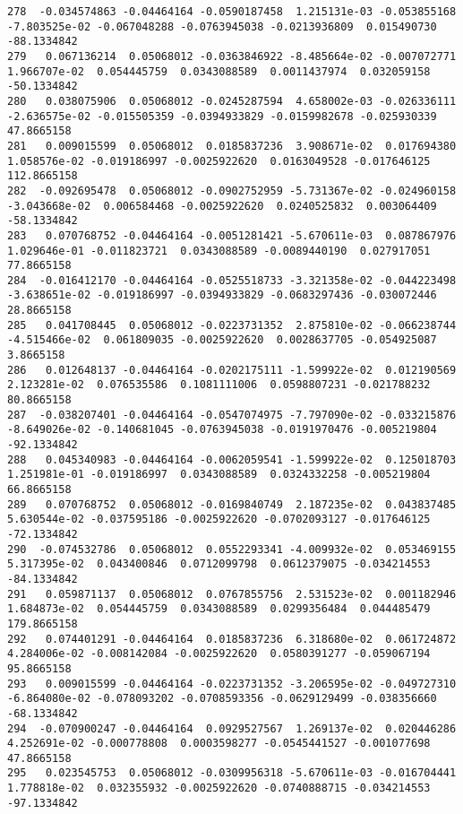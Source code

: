 \documentclass[15pt,a4paper,openright]{article}
\begin{document}
\begin{lstlisting}[language=AMPL, caption = data file]
278  -0.034574863 -0.04464164 -0.0590187458  1.215131e-03 -0.053855168 -7.803525e-02 -0.067048288 -0.0763945038 -0.0213936809  0.015490730  -88.1334842
279   0.067136214  0.05068012 -0.0363846922 -8.485664e-02 -0.007072771  1.966707e-02  0.054445759  0.0343088589  0.0011437974  0.032059158  -50.1334842
280   0.038075906  0.05068012 -0.0245287594  4.658002e-03 -0.026336111 -2.636575e-02 -0.015505359 -0.0394933829 -0.0159982678 -0.025930339   47.8665158
281   0.009015599  0.05068012  0.0185837236  3.908671e-02  0.017694380  1.058576e-02 -0.019186997 -0.0025922620  0.0163049528 -0.017646125  112.8665158
282  -0.092695478  0.05068012 -0.0902752959 -5.731367e-02 -0.024960158 -3.043668e-02  0.006584468 -0.0025922620  0.0240525832  0.003064409  -58.1334842
283   0.070768752 -0.04464164 -0.0051281421 -5.670611e-03  0.087867976  1.029646e-01 -0.011823721  0.0343088589 -0.0089440190  0.027917051   77.8665158
284  -0.016412170 -0.04464164 -0.0525518733 -3.321358e-02 -0.044223498 -3.638651e-02 -0.019186997 -0.0394933829 -0.0683297436 -0.030072446   28.8665158
285   0.041708445  0.05068012 -0.0223731352  2.875810e-02 -0.066238744 -4.515466e-02  0.061809035 -0.0025922620  0.0028637705 -0.054925087    3.8665158
286   0.012648137 -0.04464164 -0.0202175111 -1.599922e-02  0.012190569  2.123281e-02  0.076535586  0.1081111006  0.0598807231 -0.021788232   80.8665158
287  -0.038207401 -0.04464164 -0.0547074975 -7.797090e-02 -0.033215876 -8.649026e-02 -0.140681045 -0.0763945038 -0.0191970476 -0.005219804  -92.1334842
288   0.045340983 -0.04464164 -0.0062059541 -1.599922e-02  0.125018703  1.251981e-01 -0.019186997  0.0343088589  0.0324332258 -0.005219804   66.8665158
289   0.070768752  0.05068012 -0.0169840749  2.187235e-02  0.043837485  5.630544e-02 -0.037595186 -0.0025922620 -0.0702093127 -0.017646125  -72.1334842
290  -0.074532786  0.05068012  0.0552293341 -4.009932e-02  0.053469155  5.317395e-02  0.043400846  0.0712099798  0.0612379075 -0.034214553  -84.1334842
291   0.059871137  0.05068012  0.0767855756  2.531523e-02  0.001182946  1.684873e-02  0.054445759  0.0343088589  0.0299356484  0.044485479  179.8665158
292   0.074401291 -0.04464164  0.0185837236  6.318680e-02  0.061724872  4.284006e-02 -0.008142084 -0.0025922620  0.0580391277 -0.059067194   95.8665158
293   0.009015599 -0.04464164 -0.0223731352 -3.206595e-02 -0.049727310 -6.864080e-02 -0.078093202 -0.0708593356 -0.0629129499 -0.038356660  -68.1334842
294  -0.070900247 -0.04464164  0.0929527567  1.269137e-02  0.020446286  4.252691e-02 -0.000778808  0.0003598277 -0.0545441527 -0.001077698   47.8665158
295   0.023545753  0.05068012 -0.0309956318 -5.670611e-03 -0.016704441  1.778818e-02  0.032355932 -0.0025922620 -0.0740888715 -0.034214553  -97.1334842

\end{lstlisting}
\end{document}
